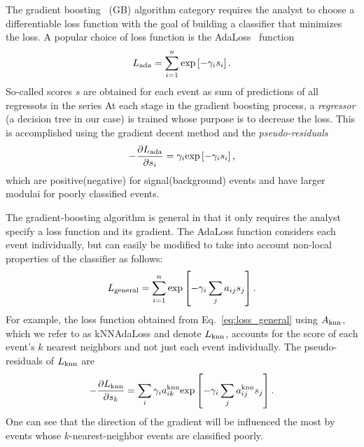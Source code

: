 The gradient boosting~\cite{ref:gradboost} (GB) algorithm category requires the analyst to choose a differentiable loss function with the goal of building a classifier that minimizes the loss.  
A popular choice of loss function is the AdaLoss~\cite{ref:adaboost} function 
\begin{equation}
L_{\rm ada} = \sum\limits_{i=1}^{n} {\rm exp}\left[-\gamma_i s_i\right]. 
\end{equation}
So-called scores $s$ are obtained for each event as sum of predictions of all regressots in the series
At each stage in the gradient boosting process, a {\em regressor} (a decision tree in our case) is trained whose purpose is to decrease the loss.  This is accomplished using the gradient decent method and the {\em pseudo-residuals}
\begin{equation}
  -\frac{\partial L_{\rm ada}}{\partial s_i} = \gamma_i  {\rm exp}\left[-\gamma_i s_i\right],
\end{equation}
which are positive(negative) for signal(background) events and have larger modulai for poorly classified events.  

The gradient-boosting algorithm is general in that it only requires the analyst specify a loss function and its gradient.  The AdaLoss function considers each event individually, but can easily be modified to take into account non-local properties of the classifier as follows:
\begin{equation}
  \label{eq:loss_general}
  L_{\rm general} = \sum\limits_{i=1}^{n} {\rm exp}\left[-\gamma_i \sum\limits_{j} a_{ij} s_j \right]. 
\end{equation} 
For example, the loss function obtained from Eq.~\ref{eq:loss_general} using $A_{\rm knn}$, which we refer to as kNNAdaLoss and denote $L_{\rm knn}$, accounts for the score of each event's $k$ nearest neighbors and not just each event individually.
The pseudo-residuals of $L_{\rm knn}$ are 
\begin{equation}
  -\frac{\partial L_{\rm knn}}{\partial s_k} = \sum\limits_i \gamma_i a_{ik}^{\rm knn} {\rm exp}\left[-\gamma_i \sum_j a_{ij}^{\rm knn} s_j \right].
\end{equation}
One can see that the direction of the gradient will be influenced the most by events whose $k$-nearest-neighbor events are classified poorly. 

